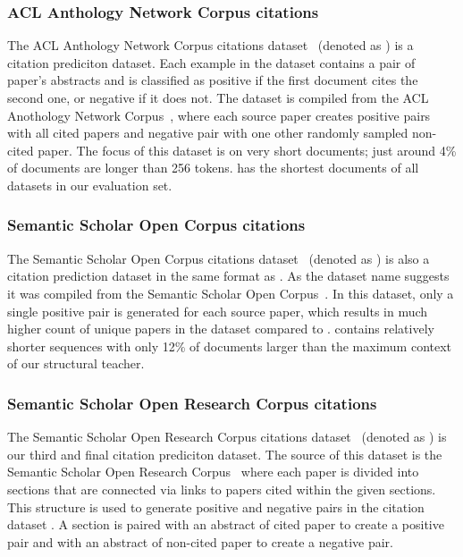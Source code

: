 \subsubsection{ACL Anthology Network Corpus citations}

The ACL Anthology Network Corpus citations dataset~\citep{zhou2020multilevel}
(denoted as ) is a citation prediciton dataset. Each example in the
dataset contains a pair of paper's abstracts and is classified as positive if
the first document cites the second one, or negative if it does not. The dataset
is compiled from the ACL Anothology Network Corpus~\citep{radev2013acl}, where
each source paper creates positive pairs with all cited papers and negative pair
with one other randomly sampled non-cited paper. The focus of this dataset is on
very short documents; just around 4\% of documents are longer than 256 tokens.
 has the shortest documents of all datasets in our evaluation set.

\subsubsection{Semantic Scholar Open Corpus citations}

The Semantic Scholar Open Corpus citations dataset~\citep{zhou2020multilevel}
(denoted as ) is also a citation prediction dataset in the same format
as . As the dataset name suggests it was compiled from the Semantic
Scholar Open Corpus~\citep{bhagavatula2018content}. In this dataset, only a
single positive pair is generated for each source paper, which results in much
higher count of unique papers in the dataset compared to . 
contains relatively shorter sequences with only 12\% of documents larger than
the maximum context of our structural teacher.

\subsubsection{Semantic Scholar Open Research Corpus citations}

The Semantic Scholar Open Research Corpus citations
dataset~\citep{zhou2020multilevel} (denoted as ) is our third and
final citation prediciton dataset. The source of this dataset is the Semantic
Scholar Open Research Corpus~\citep{lo2019s2orc} where each paper is divided
into sections that are connected via links to papers cited within the given
sections. This structure is used to generate positive and negative pairs in the
citation dataset . A section is paired with an abstract of cited
paper to create a positive pair and with an abstract of non-cited paper to
create a negative pair.

